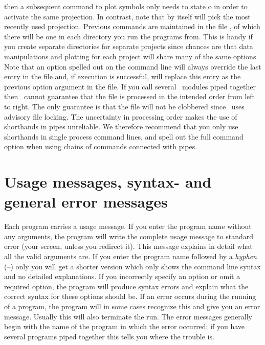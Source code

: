 \vspace{\baselineskip} 
\noindent
then a subsequent  command to plot symbols only needs
to state o in order to activate the same projection.  In
contrast, note that  by itself will pick the most recently used projection.
Previous commands are maintained in the file ,
of which there will be one in each directory you run the programs
from.  This is handy if you create separate directories for
separate projects since chances are that data manipulations
and plotting for each project will share many of the same options.
Note that an option spelled out on the command line will always
override the last entry in the  file and,
if execution is successful, will replace this entry as the
previous option argument in the  file.
If you call several \GMT\ modules piped together then \GMT\ cannot
guarantee that the  file is processed
in the intended order from left to right.  The only guarantee
is that the file will not be clobbered since \GMT\ uses advisory
file locking.  The uncertainty in processing order makes the use
of shorthands in pipes unreliable.  We therefore recommend that you
only use shorthands in single process command lines, and spell out
the full command option when using chains of commands connected with
pipes.

\section{Usage messages, syntax- and general error messages}

Each program carries a usage message.  If you enter the program
name without any arguments, the program will write the complete
usage message to standard error (your screen, unless you
redirect it).  This message explains in detail what all the
valid arguments are.  If you enter the program name followed
by a \emph{hyphen} (--) only you will get a shorter version
which only shows the command line syntax and no detailed
explanations.  If you incorrectly specify an option or omit
a required option, the program will produce syntax errors and
explain what the correct syntax for these options should be.
If an error occurs during the running of a program, the
program will in some cases recognize this and give you an
error message.  Usually this will also terminate the run.
The error messages generally begin with the name of the
program in which the error occurred; if you have several
programs piped together this tells you where the trouble is. 

